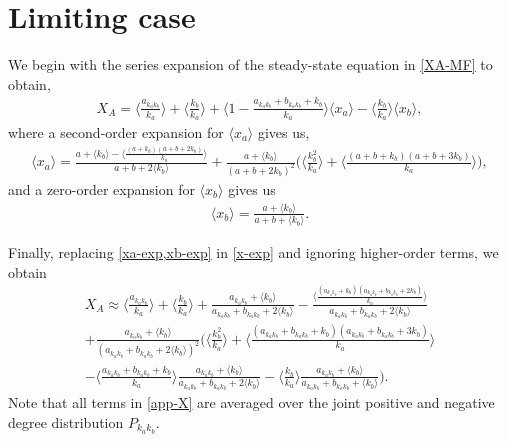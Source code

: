 \section{Limiting case}
\label{appendix-A}
We begin with the series expansion of the steady-state equation in \cref{XA-MF} to obtain,
\begin{align}
    X_{A} = \langle \frac{a_{k_{a}k_{b}}}{k_{a}} \rangle + \langle \frac{k_{b}}{k_{a}} \rangle + \langle 1 - \frac{a_{k_{a}k_{b}}+b_{k_{a}k_{b}}+k_{b}}{k_{a}} \rangle  \langle x_{a} \rangle - \langle \frac{k_{b}}{k_{a}} \rangle \langle x_{b} \rangle,
    \label{x-exp}
\end{align}
where a second-order expansion for $\langle x_{a} \rangle$ gives us, 
\begin{align}
    \langle x_{a} \rangle = \frac{a+\langle k_{b} \rangle - \langle \frac{(a+k_{b})(a+b+2k_{b})}{k_{a}} \rangle }{a+b+2\langle k_{b} \rangle} + \frac{a+\langle k_{b} \rangle }{(a+b+2k_{b})^2}\Bigg( \langle \frac{k_{b}^2}{k_{a}} \rangle + \langle \frac{(a+b+k_{b})(a+b+3k_{b})}{k_{a}} \rangle \Bigg),
    \label{xa-exp}
\end{align}
and a zero-order expansion for $\langle x_{b} \rangle$ gives us
\begin{align}
  \langle x_{b} \rangle = \frac{a+\langle k_{b} \rangle}{a+b+\langle k_{b} \rangle}.
  \label{xb-exp}
\end{align}

Finally, replacing \cref{xa-exp,xb-exp} in \cref{x-exp} and ignoring higher-order terms, we obtain
\begin{equation}
\begin{split}
    X_{A} \approx \langle \frac{a_{k_{a}k_{b}}}{k_{a}} \rangle + \langle \frac{k_{b}}{k_{a}} \rangle + \frac{a_{k_{a}k_{b}}+\langle k_{b} \rangle}{a_{k_{a}k_{b}}+b_{k_{a}k_{b}}+2\langle k_{b} \rangle} - \frac{\langle \frac{(a_{k_{a}k_{b}}+k_{b})(a_{k_{a}k_{b}}+b_{k_{a}k_{b}}+2k_{b})}{k_{a}} \rangle}{a_{k_{a}k_{b}}+b_{k_{a}k_{b}}+2\langle k_{b} \rangle} \\ + \frac{a_{k_{a}k_{b}}+\langle k_{b} \rangle}{(a_{k_{a}k_{b}}+b_{k_{a}k_{b}}+2\langle k_{b} \rangle)^2}\Bigg( \langle \frac{k_{b}^2}{k_{a}} \rangle  + \langle \frac{(a_{k_{a}k_{b}}+b_{k_{a}k_{b}}+k_{b})(a_{k_{a}k_{b}}+b_{k_{a}k_{b}}+3k_{b})}{k_{a}} \rangle \\ 
    - \langle \frac{a_{k_{a}k_{b}}+b_{k_{a}k_{b}}+k_{b}}{k_{a}} \rangle \frac{a_{k_{a}k_{b}}+\langle k_{b} \rangle }{a_{k_{a}k_{b}}+b_{k_{a}k_{b}}+2\langle k_{b}\rangle} - \langle \frac{k_{b}}{k_{a}} \rangle  \frac{a_{k_{a}k_{b}}+\langle k_{b}\rangle}{a_{k_{a}k_{b}}+b_{k_{a}k_{b}}+\langle k_{b}\rangle}  \Bigg).
\end{split}
\label{app-X}
\end{equation}
Note that all terms in \cref{app-X} are averaged over the joint positive and negative degree distribution $P_{k_{a}k_{b}}$.

